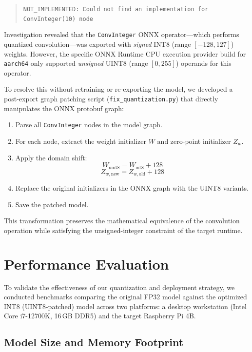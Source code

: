 \documentclass[conference]{IEEEtran}
\begin{document}
\begin{quote}
\small\texttt{NOT\_IMPLEMENTED: Could not find an implementation for ConvInteger(10) node}
\end{quote}

Investigation revealed that the \texttt{ConvInteger} ONNX operator---which performs quantized convolution---was exported with \textit{signed} INT8 (range $[-128, 127]$) weights. However, the specific ONNX Runtime CPU execution provider build for \texttt{aarch64} only supported \textit{unsigned} UINT8 (range $[0, 255]$) operands for this operator.

To resolve this without retraining or re-exporting the model, we developed a post-export graph patching script (\texttt{fix\_quantization.py}) that directly manipulates the ONNX protobuf graph:

\begin{enumerate}
\item Parse all \texttt{ConvInteger} nodes in the model graph.
\item For each node, extract the weight initializer $W$ and zero-point initializer $Z_w$.
\item Apply the domain shift:
\begin{equation}
W_{\text{uint8}} = W_{\text{int8}} + 128
\end{equation}
\begin{equation}
Z_{w,\text{new}} = Z_{w,\text{old}} + 128
\end{equation}
\item Replace the original initializers in the ONNX graph with the UINT8 variants.
\item Save the patched model.
\end{enumerate}

This transformation preserves the mathematical equivalence of the convolution operation while satisfying the unsigned-integer constraint of the target runtime.

\section{Performance Evaluation}
To validate the effectiveness of our quantization and deployment strategy, we conducted benchmarks comparing the original FP32 model against the optimized INT8 (UINT8-patched) model across two platforms: a desktop workstation (Intel Core i7-12700K, 16\,GB DDR5) and the target Raspberry Pi 4B.

\subsection{Model Size and Memory Footprint}
\end{document}
